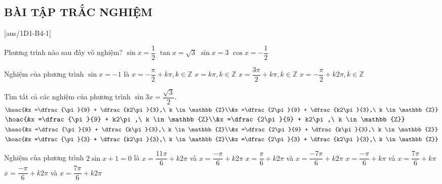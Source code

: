 \subsection{BÀI TẬP TRẮC NGHIỆM}
\setcounter{ex}{0}
\TN
\setcounter{ex}{0}
[ans/1D1-B4-1]
\begin{ex}%
	Phương trình nào sau đây vô nghiệm?
	\choice
	{$\sin x=\dfrac{1}{2}$}
	{$\tan x=\sqrt{3}$}
	{\True $\sin x=3$}
	{$\cos x=-\dfrac{1}{2}$}
\end{ex}

\begin{ex}%
	Nghiệm của phương trình $\sin x=-1$ là
	\choice
	{$x=-\dfrac{\pi}{2}+k\pi,k\in\mathbb{Z}$}
	{$x=k\pi,k\in\mathbb{Z}$}
	{$x=\dfrac{3\pi}{2}+k\pi,k\in\mathbb{Z}$}
	{\True $x=-\dfrac{\pi}{2}+k2\pi,k\in\mathbb{Z}$}
\end{ex}

\begin{ex}%
	Tìm tất cả các nghiệm của phương trình $\sin3x =\dfrac{\sqrt{3}}{2}$.
	\choice
	{\True $\hoac{&x =\dfrac{\pi}{9} + \dfrac{k2\pi}{3},\ k \in\mathbb{Z}\\&x =\dfrac{2\pi}{9} + \dfrac{k2\pi}{3},\ k \in\mathbb{Z}}$}
	{$\hoac{&x =\dfrac{\pi}{9} + k2\pi ,\ k \in\mathbb{Z}\\&x =\dfrac{2\pi}{9} + k2\pi ,\ k \in\mathbb{Z}}$}
	{$\hoac{&x =\dfrac{\pi}{9} + \dfrac{k\pi}{3},\ k \in\mathbb{Z}\\&x =\dfrac{2\pi}{9} + \dfrac{k\pi}{3},\ k \in\mathbb{Z}}$}
	{$\hoac{&x =\dfrac{\pi}{3} + \dfrac{k2\pi}{3},\ k \in\mathbb{Z}\\&x =\dfrac{2\pi}{3} + \dfrac{k2\pi}{3},\ k \in\mathbb{Z}}$}
\end{ex}

\begin{ex}%
	Nghiệm của phương trình $2\sin x+1=0$ là
	\choice
	{$x=\dfrac{11\pi}{6}+k2\pi $ và $x=\dfrac{-\pi}{6}+k2\pi $}
	{$x=\dfrac{\pi}{6}+k2\pi $ và $x=\dfrac{-7\pi}{6}+k2\pi $}
	{$x=\dfrac{-\pi}{6}+k\pi $ và $x=\dfrac{7\pi}{6}+k\pi $}
	{\True $x=\dfrac{-\pi}{6}+k2\pi $ và $x=\dfrac{7\pi}{6}+k2\pi$}
\end{ex}

